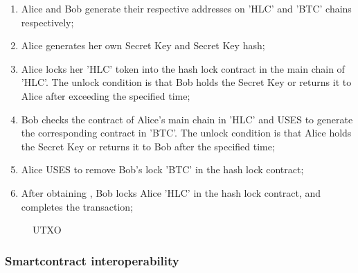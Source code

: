 \documentclass[a4paper,11pt]{article}
\begin{document}
\begin{enumerate}
\item  Alice and Bob generate their respective addresses on 'HLC' and 'BTC' chains respectively;

\item Alice generates her own Secret Key and Secret Key hash;

\item Alice locks her 'HLC' token into the hash lock contract in the main chain of 'HLC'. The unlock condition is that Bob holds the Secret Key or returns it to Alice after exceeding the specified time;

\item Bob checks the contract of Alice's main chain in 'HLC' and USES to generate the corresponding contract in 'BTC'. The unlock condition is that Alice holds the Secret Key or returns it to Bob after the specified time;

\item Alice USES to remove Bob's lock 'BTC' in the hash lock contract;

\item After obtaining , Bob locks Alice 'HLC' in the hash lock contract, and completes the transaction;
	
\end{enumerate}

\begin{figure}[hbt]
	\centerline{%
	}
\caption{UTXO}
\end{figure}



\subsubsection{Smartcontract interoperability}
\end{document}
